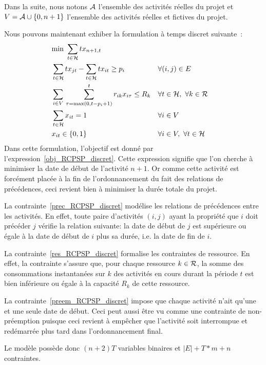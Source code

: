 Dans la suite, nous notons ${\cal A}$ l'ensemble des
activités réelles du projet et $V={\cal A} \cup \{0,n+1\}$
l'ensemble des activités réelles et fictives du projet.

Nous pouvons maintenant exhiber la formulation à temps discret
suivante~\cite{ex_RCPSP_discret}:
{\small \begin{align} &\text{min }
\sum_{t \in {\cal H}} tx_{n+1,t} \label{obj_RCPSP_discret}\\
&\sum_{t \in {\cal H}} tx_{jt} - \sum_{t \in {\cal H}} tx_{it} \ge p_i &
&\forall (i,j) \in E \label{prec_RCPSP_discret}\\ &\sum_{i \in
V}\,\sum_{\tau=\max(0,t-p_i+1)}^t r_{ik}x_{i\tau} \le R_k& &\forall t\in
{\cal H},\ \forall k \in {\cal R} \label{res_RCPSP_discret}\\
&\sum_{t\in {\cal H}} x_{it}=1& & \forall i \in V
\label{preem_RCPSP_discret}\\ & x_{it} \in \{0,1\} & &\forall i
\in V,\ \forall t \in {\cal H} \end{align}
 } 
Dans cette formulation, l'objectif est donné par
l'expression~\eqref{obj_RCPSP_discret}. Cette expression signifie que
l'on cherche à minimiser la date de début de l'activité $n+1$. Or
comme cette activité est forcément placée à la fin de
l'ordonnancement du fait des relations de précédences, ceci
revient bien à minimiser la durée totale du projet.

La contrainte~\eqref{prec_RCPSP_discret} modélise les relations de
précédences entre les activités. En effet, toute paire d'activités
$(i,j)$ ayant la propriété que $i$ doit précéder $j$ vérifie la
relation suivante: la date de début de $j$ est supérieure ou égale
à la date de début de $i$ plus sa durée, i.e. la date de fin de
$i$.

La contrainte~\eqref{res_RCPSP_discret} formalise les contraintes de
ressource. En effet, la contrainte s'assure que, pour chaque ressource
$k \in {\cal R}$, la somme des consommations instantanées sur $k$ des
activités en cours durant la période $t$ est bien inférieure ou égale à la
capacité $R_k$ de cette ressource.

La contrainte~\eqref{preem_RCPSP_discret} impose que chaque activité
n'ait qu'une et une seule date de début. Ceci peut aussi être vu comme
une contrainte de non-préemption puisque ceci revient à empêcher que
l'activité soit interrompue et redémarrée plus tard dans
l'ordonnancement final.

Le modèle possède donc $(n+2)T$ variables binaires et
$|E|+T*m+n$ contraintes.

